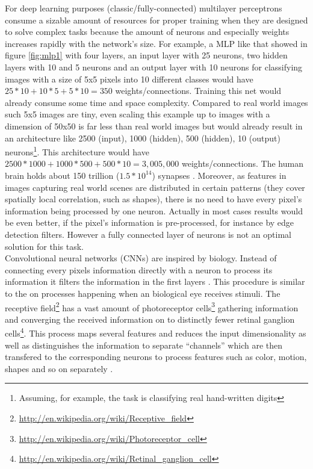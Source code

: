 \documentclass[12pt,twoside]{article}
\theoremstyle{plain}
\theoremstyle{definition}
\theoremstyle{remark}
\begin{document}
For deep learning purposes (classic/fully-connected) multilayer perceptrons consume a sizable amount of resources for proper training when they are designed to solve complex tasks because the amount of neurons and especially weights increases rapidly with the network's size.
For example, a MLP like that showed in figure \ref{fig:mlp1} with four layers, an input layer with 25 neurons, two hidden layers with 10 and 5 neurons and an output layer with 10 neurons for classifying images with a size of 5x5 pixels into 10 different classes would have $25 * 10 + 10 * 5 + 5 * 10 = 350$ weights/connections. Training this net would already consume some time and space complexity. Compared to real world images such 5x5 images are tiny, even scaling this example up to images with a dimension of 50x50 is far less than real world images but would already result in an architecture like 2500 (input), 1000 (hidden), 500 (hidden), 10 (output) neurons\footnote{Assuming, for example, the task is classifying real hand-written digits}.
This architecture would have $2500 * 1000 + 1000 * 500 + 500 * 10 = 3,005,000$ weights/connections.
The human brain holds about 150 trillion ($1.5 * 10^{14}$) synapses \cite{AgingNeocortex-AmountOfSynapses}.
Moreover, as features in images capturing real world scenes are distributed in certain patterns (they cover spatially local correlation, such as shapes), there is no need to have every pixel's information being processed by one neuron. Actually in most cases results would be even better, if the pixel's information is pre-processed, for instance by edge detection filters. However a fully connected layer of neurons is not an optimal solution for this task.
\\
Convolutional neural networks (CNNs) are inspired by biology. Instead of connecting every pixels information directly with a neuron to process its information it filters the information in the first layers \cite{ImangeNetClassificationCNN-Krizhevsky}. This procedure is similar to the on processes happening when an biological eye receives stimuli.
The receptive field\footnote{\url{http://en.wikipedia.org/wiki/Receptive_field}} has a vast amount of photoreceptor cells\footnote{\url{http://en.wikipedia.org/wiki/Photoreceptor_cell}} gathering information and converging the received information on to distinctly fewer retinal ganglion cells\footnote{\url{http://en.wikipedia.org/wiki/Retinal_ganglion_cell}}. This process maps several features and reduces the input dimensionality as well as distinguishes the information to separate \enquote{channels} which are then transfered to the corresponding neurons to process features such as color, motion, shapes and so on separately \cite{DeepHierarchiesVisualCortex-kruger}.
\end{document}
